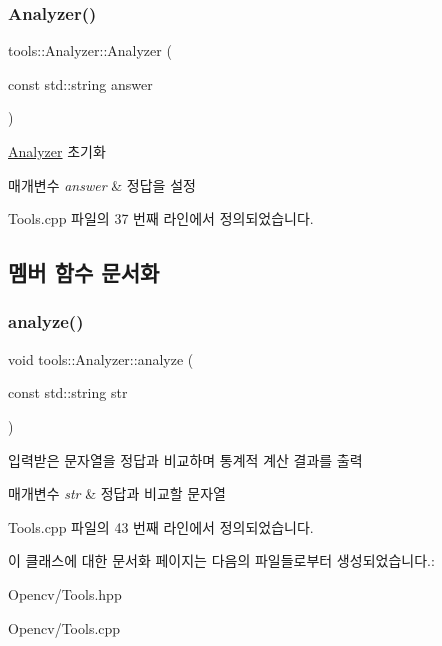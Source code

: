 \subsubsection{\texorpdfstring{Analyzer()}{Analyzer()}}
{\footnotesize\ttfamily tools\+::\+Analyzer\+::\+Analyzer (\begin{DoxyParamCaption}\item[{const std\+::string}]{answer }\end{DoxyParamCaption})}



\hyperlink{classtools_1_1_analyzer}{Analyzer} 초기화 


\begin{DoxyParams}{매개변수}
{\em answer} & 정답을 설정 \\
\hline
\end{DoxyParams}


Tools.\+cpp 파일의 37 번째 라인에서 정의되었습니다.



\subsection{멤버 함수 문서화}
\mbox{\label{classtools_1_1_analyzer_abd1e57e10b843dca874e933236363efa}} 
\subsubsection{\texorpdfstring{analyze()}{analyze()}}
{\footnotesize\ttfamily void tools\+::\+Analyzer\+::analyze (\begin{DoxyParamCaption}\item[{const std\+::string}]{str }\end{DoxyParamCaption})}



입력받은 문자열을 정답과 비교하며 통계적 계산 결과를 출력 


\begin{DoxyParams}{매개변수}
{\em str} & 정답과 비교할 문자열 \\
\hline
\end{DoxyParams}


Tools.\+cpp 파일의 43 번째 라인에서 정의되었습니다.



이 클래스에 대한 문서화 페이지는 다음의 파일들로부터 생성되었습니다.\+:\begin{DoxyCompactItemize}
\item 
Opencv/Tools.\+hpp\item 
Opencv/Tools.\+cpp\end{DoxyCompactItemize}
